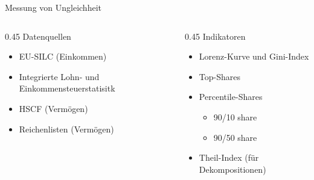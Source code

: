 \documentclass[aspectratio=169,xcolor=dvipsnames]{beamer}
\begin{document}
\begin{frame}[label = messung]{Messung von Ungleichheit}
    \begin{columns}
        \begin{column}{0.45\textwidth}
            Datenquellen
            \begin{itemize}
                \item EU-SILC (Einkommen)
                \item Integrierte Lohn- und Einkommensteuerstatisitk
                \item HSCF (Vermögen)
                \item Reichenlisten (Vermögen)
            \end{itemize}
        \end{column}

        \pause
        \begin{column}{0.45\textwidth}
            Indikatoren
            \begin{itemize}
                \item Lorenz-Kurve und Gini-Index
                \item Top-Shares
                \item Percentile-Shares
                \begin{itemize}
                    \item 90/10 share
                    \item 90/50 share
                \end{itemize}
                \item Theil-Index (für Dekompositionen)
            \end{itemize}
        \end{column}
    \end{columns}
    \vspace{0.5cm}
    \hyperlink{ungleichheit-was-wer}{}
\end{frame}
\end{document}
